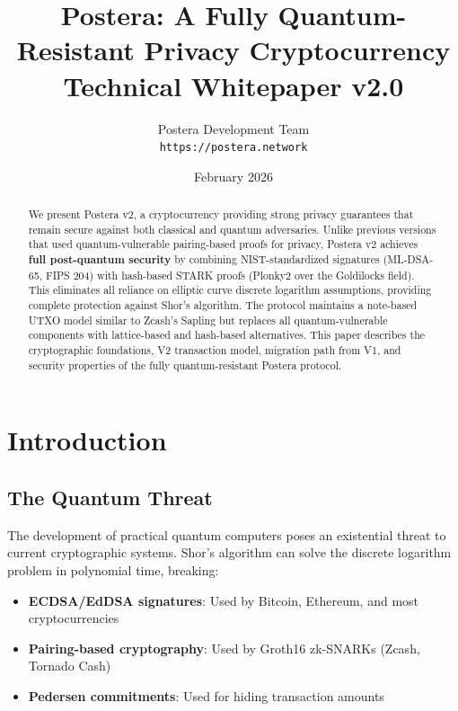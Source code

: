 \documentclass[11pt,a4paper]{article}
\title{
    \vspace{-1cm}
    \textbf{Postera: A Fully Quantum-Resistant Privacy Cryptocurrency}\\[0.5em]
    \large Technical Whitepaper v2.0
}
\author{
    Postera Development Team\\
    \texttt{https://postera.network}
}
\date{February 2026}
\begin{document}
\maketitle

\begin{abstract}
We present Postera v2, a cryptocurrency providing strong privacy guarantees that remain secure against both classical and quantum adversaries. Unlike previous versions that used quantum-vulnerable pairing-based proofs for privacy, Postera v2 achieves \textbf{full post-quantum security} by combining NIST-standardized signatures (ML-DSA-65, FIPS 204) with hash-based STARK proofs (Plonky2 over the Goldilocks field). This eliminates all reliance on elliptic curve discrete logarithm assumptions, providing complete protection against Shor's algorithm. The protocol maintains a note-based UTXO model similar to Zcash's Sapling but replaces all quantum-vulnerable components with lattice-based and hash-based alternatives. This paper describes the cryptographic foundations, V2 transaction model, migration path from V1, and security properties of the fully quantum-resistant Postera protocol.
\end{abstract}

\tableofcontents
\newpage

\section{Introduction}

\subsection{The Quantum Threat}

The development of practical quantum computers poses an existential threat to current cryptographic systems. Shor's algorithm can solve the discrete logarithm problem in polynomial time, breaking:

\begin{itemize}
    \item \textbf{ECDSA/EdDSA signatures}: Used by Bitcoin, Ethereum, and most cryptocurrencies
    \item \textbf{Pairing-based cryptography}: Used by Groth16 zk-SNARKs (Zcash, Tornado Cash)
    \item \textbf{Pedersen commitments}: Used for hiding transaction amounts
\end{itemize}
\end{document}
